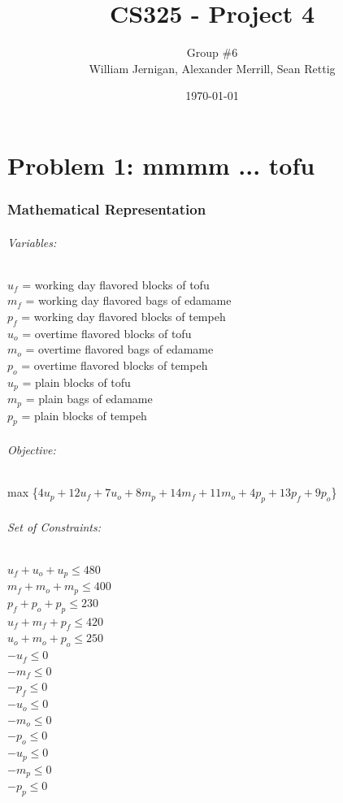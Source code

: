 \documentclass{article}
\title{CS325 - Project 4}
\author{Group \#6 \\ William Jernigan, Alexander Merrill, Sean Rettig}
\date{\today}
\begin{document}
\maketitle

\part*{Problem 1: mmmm ... tofu}
\section*{Mathematical Representation}
\paragraph*{Variables:\\}
$u_f$ = working day flavored blocks of tofu\\
$m_f$ = working day flavored bags of edamame\\
$p_f$ = working day flavored blocks of tempeh\\
$u_o$ = overtime flavored blocks of tofu\\
$m_o$ = overtime flavored bags of edamame\\
$p_o$ = overtime flavored blocks of tempeh\\
$u_p$ = plain blocks of tofu\\
$m_p$ = plain bags of edamame\\
$p_p$ = plain blocks of tempeh\\

\paragraph*{Objective:}
max \{$4u_p + 12u_f + 7u_o + 8m_p + 14m_f + 11m_o + 4p_p + 13p_f + 9p_o$\}
\paragraph*{Set of Constraints:\\}
$u_f + u_o + u_p \leq 480$\\ %
$m_f + m_o + m_p \leq 400$\\ %
$p_f + p_o + p_p \leq 230$\\ %
$u_f + m_f + p_f \leq 420$\\ %
$u_o + m_o + p_o \leq 250$\\ %
$-u_f \leq 0$\\
$-m_f \leq 0$\\
$-p_f \leq 0$\\
$-u_o \leq 0$\\
$-m_o \leq 0$\\
$-p_o \leq 0$\\
$-u_p \leq 0$\\
$-m_p \leq 0$\\
$-p_p \leq 0$\\
\end{document}
